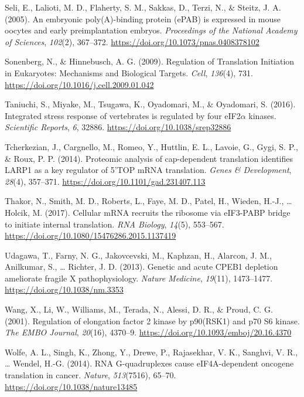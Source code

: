 \documentclass[12pt,openany]{book}
\begin{document}
\hypertarget{ref-Seli2005}{}
Seli, E., Lalioti, M. D., Flaherty, S. M., Sakkas, D., Terzi, N., \&
Steitz, J. A. (2005). An embryonic poly(A)-binding protein (ePAB) is
expressed in mouse oocytes and early preimplantation embryos.
\emph{Proceedings of the National Academy of Sciences}, \emph{102}(2),
367--372. \url{https://doi.org/10.1073/pnas.0408378102}

\hypertarget{ref-Sonenberg2009}{}
Sonenberg, N., \& Hinnebusch, A. G. (2009). Regulation of Translation
Initiation in Eukaryotes: Mechanisms and Biological Targets.
\emph{Cell}, \emph{136}(4), 731.
\url{https://doi.org/10.1016/j.cell.2009.01.042}

\hypertarget{ref-Taniuchi2016}{}
Taniuchi, S., Miyake, M., Tsugawa, K., Oyadomari, M., \& Oyadomari, S.
(2016). Integrated stress response of vertebrates is regulated by four
eIF2\(\alpha\) kinases. \emph{Scientific Reports}, \emph{6}, 32886.
\url{https://doi.org/10.1038/srep32886}

\hypertarget{ref-Tcherkezian2014}{}
Tcherkezian, J., Cargnello, M., Romeo, Y., Huttlin, E. L., Lavoie, G.,
Gygi, S. P., \& Roux, P. P. (2014). Proteomic analysis of cap-dependent
translation identifies LARP1 as a key regulator of 5'TOP mRNA
translation. \emph{Genes \& Development}, \emph{28}(4), 357--371.
\url{https://doi.org/10.1101/gad.231407.113}

\hypertarget{ref-Thakor2017}{}
Thakor, N., Smith, M. D., Roberts, L., Faye, M. D., Patel, H., Wieden,
H.-J., \ldots{} Holcik, M. (2017). Cellular mRNA recruits the ribosome
via eIF3-PABP bridge to initiate internal translation. \emph{RNA
Biology}, \emph{14}(5), 553--567.
\url{https://doi.org/10.1080/15476286.2015.1137419}

\hypertarget{ref-Udagawa2013}{}
Udagawa, T., Farny, N. G., Jakovcevski, M., Kaphzan, H., Alarcon, J. M.,
Anilkumar, S., \ldots{} Richter, J. D. (2013). Genetic and acute CPEB1
depletion ameliorate fragile X pathophysiology. \emph{Nature Medicine},
\emph{19}(11), 1473--1477. \url{https://doi.org/10.1038/nm.3353}

\hypertarget{ref-Wang2001}{}
Wang, X., Li, W., Williams, M., Terada, N., Alessi, D. R., \& Proud, C.
G. (2001). Regulation of elongation factor 2 kinase by p90(RSK1) and p70
S6 kinase. \emph{The EMBO Journal}, \emph{20}(16), 4370--9.
\url{https://doi.org/10.1093/emboj/20.16.4370}

\hypertarget{ref-Wolfe2014}{}
Wolfe, A. L., Singh, K., Zhong, Y., Drewe, P., Rajasekhar, V. K.,
Sanghvi, V. R., \ldots{} Wendel, H.-G. (2014). RNA G-quadruplexes cause
eIF4A-dependent oncogene translation in cancer. \emph{Nature},
\emph{513}(7516), 65--70. \url{https://doi.org/10.1038/nature13485}
\end{document}
